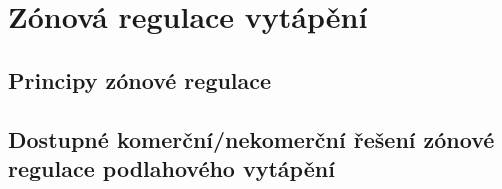 \section{Zónová regulace vytápění}

\subsection{Principy zónové regulace}

\subsection{Dostupné komerční/nekomerční řešení zónové regulace podlahového vytápění}








